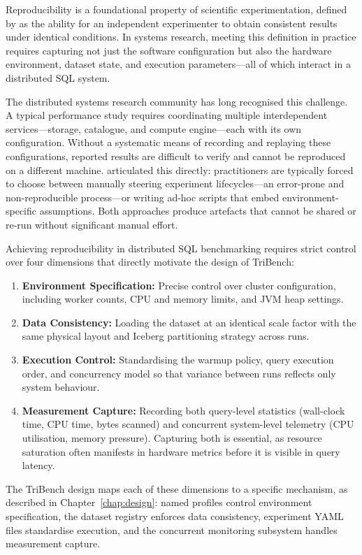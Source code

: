 \documentclass{l4proj}
\begin{document}
Reproducibility is a foundational property of scientific experimentation, defined by \citet{jain1991art} as the ability for an independent experimenter to obtain consistent results under identical conditions. In systems research, meeting this definition in practice requires capturing not just the software configuration but also the hardware environment, dataset state, and execution parameters---all of which interact in a distributed SQL system.

The distributed systems research community has long recognised this challenge. A typical performance study requires coordinating multiple interdependent services---storage, catalogue, and compute engine---each with its own configuration. Without a systematic means of recording and replaying these configurations, reported results are difficult to verify and cannot be reproduced on a different machine. \citet{peel_github} articulated this directly: practitioners are typically forced to choose between manually steering experiment lifecycles---an error-prone and non-reproducible process---or writing ad-hoc scripts that embed environment-specific assumptions. Both approaches produce artefacts that cannot be shared or re-run without significant manual effort.

Achieving reproducibility in distributed SQL benchmarking requires strict control over four dimensions that directly motivate the design of TriBench:
\begin{enumerate}
\item \textbf{Environment Specification:} Precise control over cluster configuration, including worker counts, CPU and memory limits, and JVM heap settings.
\item \textbf{Data Consistency:} Loading the dataset at an identical scale factor with the same physical layout and Iceberg partitioning strategy across runs.
\item \textbf{Execution Control:} Standardising the warmup policy, query execution order, and concurrency model so that variance between runs reflects only system behaviour.
\item \textbf{Measurement Capture:} Recording both query-level statistics (wall-clock time, CPU time, bytes scanned) and concurrent system-level telemetry (CPU utilisation, memory pressure). Capturing both is essential, as resource saturation often manifests in hardware metrics before it is visible in query latency.
\end{enumerate}

The TriBench design maps each of these dimensions to a specific mechanism, as described in Chapter~\ref{chap:design}: named profiles control environment specification, the dataset registry enforces data consistency, experiment YAML files standardise execution, and the concurrent monitoring subsystem handles measurement capture.
\end{document}
